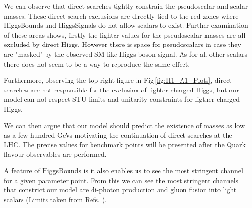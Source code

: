 %
We can observe that direct searches tightly constrain the pseudoscalar and scalar masses. 
%
These direct search exclusions are directly tied to the red zones where HiggsBounds and HiggsSignals do not allow scalars to exist. 
%
Further examination of these areas shows, firstly the lighter values for the pseudoscalar masses are all excluded by direct Higgs. However there is space for pseudoscalars in case they are "masked" by the observed SM-like Higgs boson signal.  
%
As for all other scalars there does not seem to be a way to reproduce the same effect. 

Furthermore, observing the top right figure in Fig\,\ref{fig:H1_A1_Plots}, direct searches are not responsible for the exclusion of lighter charged Higgs, but our model can not respect STU limits and unitarity constraints for ligther charged Higgs.  

%
We can then argue that our model should predict the existence of masses as low as a few hundred GeVs motivating the continuation of direct searches at the LHC. 
%
The precise values for benchmark points will be presented after the Quark flavour observables are performed. 



A feature of HiggsBounds is it also enables us to see the most stringent channel for a given parameter point. 
%
From this we can see the most stringent channels that constrict our model are di-photon production and gluon fusion into light scalars (Limits taken from Refs. \cite{Aad_2014,CMS-PAS-HIG-14-029,Khachatryan_2015}). 
%
%
%

